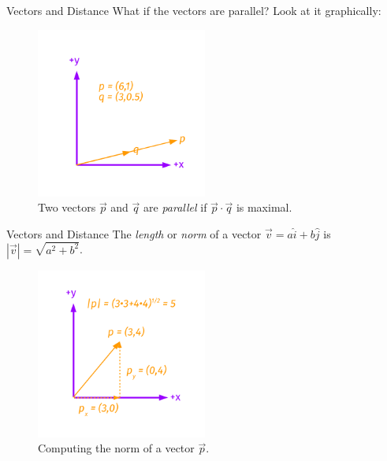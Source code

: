 \documentclass{beamer}
\begin{document}
\begin{frame}{Vectors and Distance}
What if the vectors are parallel? Look at it graphically:
\begin{figure}
\centering
\includegraphics[width=0.5\textwidth,trim=1cm 1cm 1cm 1cm,clip=true]{figures/Vectors6.pdf}
\caption{\label{fig:twovectors5} Two vectors $\vec{p}$ and $\vec{q}$ are \textit{parallel} if $\vec{p} \cdot \vec{q}$ is maximal.}
\end{figure}
\end{frame}

\begin{frame}{Vectors and Distance}
The \textit{length} or \textit{norm} of a vector $\vec{v} = a\hat{i}+b\hat{j}$ is $|\vec{v}| = \sqrt{a^2+b^2}$.\\
\begin{figure}
\centering
\includegraphics[width=0.5\textwidth,trim=1cm 1cm 1cm 1cm,clip=true]{figures/Vectors7.pdf}
\caption{\label{fig:twovectors6} Computing the norm of a vector $\vec{p}$.}
\end{figure}
\end{frame}
\end{document}
